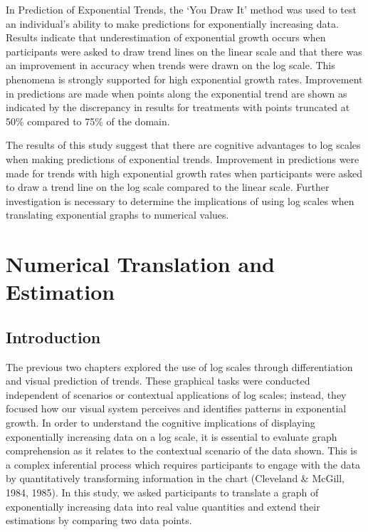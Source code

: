 \documentclass[print]{nuthesis}
\begin{document}
In Prediction of Exponential Trends, the `You Draw It' method was used to test an individual's ability to make predictions for exponentially increasing data.
Results indicate that underestimation of exponential growth occurs when participants were asked to draw trend lines on the linear scale and that there was an improvement in accuracy when trends were drawn on the log scale.
This phenomena is strongly supported for high exponential growth rates.
Improvement in predictions are made when points along the exponential trend are shown as indicated by the discrepancy in results for treatments with points truncated at 50\% compared to 75\% of the domain.

The results of this study suggest that there are cognitive advantages to log scales when making predictions of exponential trends.
Improvement in predictions were made for trends with high exponential growth rates when participants were asked to draw a trend line on the log scale compared to the linear scale.
Further investigation is necessary to determine the implications of using log scales when translating exponential graphs to numerical values.

\hypertarget{estimation}{%
\chapter{Numerical Translation and Estimation}\label{estimation}}

\hypertarget{introduction-2}{%
\section{Introduction}\label{introduction-2}}

The previous two chapters explored the use of log scales through differentiation and visual prediction of trends.
These graphical tasks were conducted independent of scenarios or contextual applications of log scales; instead, they focused how our visual system perceives and identifies patterns in exponential growth.
In order to understand the cognitive implications of displaying exponentially increasing data on a log scale, it is essential to evaluate graph comprehension as it relates to the contextual scenario of the data shown.
This is a complex inferential process which requires participants to engage with the data by quantitatively transforming information in the chart (Cleveland \& McGill, 1984, 1985).
In this study, we asked participants to translate a graph of exponentially increasing data into real value quantities and extend their estimations by comparing two data points.
\end{document}
